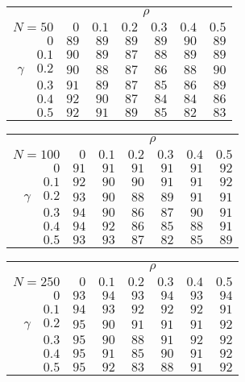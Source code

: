 \begin{tabular}{r|rrrrrr}
\hline\hline
 &\multicolumn{6}{c}{$\rho$} \\ 
 $N = 50$ & $0$ & $0.1$ & $0.2$ & $0.3$ & $0.4$ & $0.5$ \\ 
 \hline$0$ & $89$ & $89$ & $89$ & $89$ & $90$ & $89$\\ 
$0.1$ & $90$ & $89$ & $87$ & $88$ & $89$ & $89$\\ 
$\gamma\quad$$0.2$ & $90$ & $88$ & $87$ & $86$ & $88$ & $90$\\ 
$0.3$ & $91$ & $89$ & $87$ & $85$ & $86$ & $89$\\ 
$0.4$ & $92$ & $90$ & $87$ & $84$ & $84$ & $86$\\ 
$0.5$ & $92$ & $91$ & $89$ & $85$ & $82$ & $83$\\ 
 \hline 
 \end{tabular}
 
 \vspace{2em} 
 
\begin{tabular}{r|rrrrrr}
\hline\hline
 &\multicolumn{6}{c}{$\rho$} \\ 
 $N = 100$ & $0$ & $0.1$ & $0.2$ & $0.3$ & $0.4$ & $0.5$ \\ 
 \hline$0$ & $91$ & $91$ & $91$ & $91$ & $91$ & $92$\\ 
$0.1$ & $92$ & $90$ & $90$ & $91$ & $91$ & $92$\\ 
$\gamma\quad$$0.2$ & $93$ & $90$ & $88$ & $89$ & $91$ & $91$\\ 
$0.3$ & $94$ & $90$ & $86$ & $87$ & $90$ & $91$\\ 
$0.4$ & $94$ & $92$ & $86$ & $85$ & $88$ & $91$\\ 
$0.5$ & $93$ & $93$ & $87$ & $82$ & $85$ & $89$\\ 
 \hline 
 \end{tabular}
 
 \vspace{2em} 
 
\begin{tabular}{r|rrrrrr}
\hline\hline
 &\multicolumn{6}{c}{$\rho$} \\ 
 $N = 250$ & $0$ & $0.1$ & $0.2$ & $0.3$ & $0.4$ & $0.5$ \\ 
 \hline$0$ & $93$ & $94$ & $93$ & $94$ & $93$ & $94$\\ 
$0.1$ & $94$ & $93$ & $92$ & $92$ & $92$ & $91$\\ 
$\gamma\quad$$0.2$ & $95$ & $90$ & $91$ & $91$ & $91$ & $92$\\ 
$0.3$ & $95$ & $90$ & $88$ & $91$ & $92$ & $92$\\ 
$0.4$ & $95$ & $91$ & $85$ & $90$ & $91$ & $92$\\ 
$0.5$ & $95$ & $92$ & $83$ & $88$ & $91$ & $92$\\ 
 \hline 
 \end{tabular}